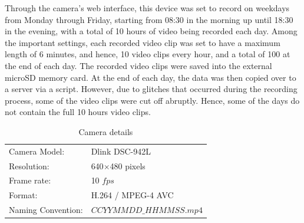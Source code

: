 Through the camera's web interface, this device was set to record on weekdays from Monday through Friday, starting from 08:30 in the morning up until 18:30 in the evening, with a total of 10 hours of video being recorded each day. Among the important settings, each recorded video clip was set to have a maximum length of 6 minutes, and hence, 10 video clips every hour, and a total of 100 at the end of each day. The recorded video clips were saved into the external microSD memory card. At the end of each day, the data was then copied over to a server via a script. However, due to glitches that occurred during the recording process, some of the video clips were cut off abruptly. Hence, some of the days do not contain the full 10 hours video clips. 

\begin{table}[]\centering
\begin{tabular}{ll}
Camera Model: & Dlink DSC-942L        \\
Resolution:   & 640$\times$480 pixels \\
Frame rate:   & 10 $fps$             \\
Format:       & H.264 / MPEG-4 AVC    \\
Naming Convention: & $CCYYMMDD\_HHMMSS.mp4$
\end{tabular}
\vspace{1em}
\caption{Camera details}
\end{table}

